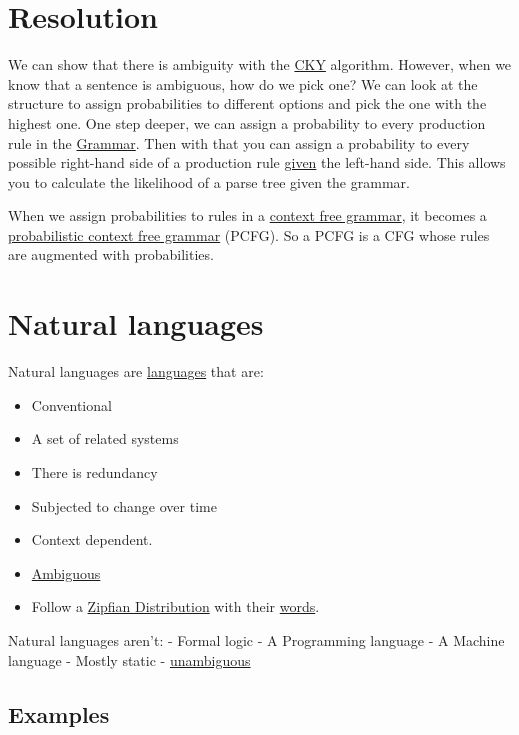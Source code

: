 \documentclass[
  11pt,
  british,
]{article}
\providecommand{\tightlist}{%
  \setlength{\itemsep}{0pt}\setlength{\parskip}{0pt}}
\begin{document}
\hypertarget{resolution}{%
\section{Resolution}\label{resolution}}

We can show that there is ambiguity with the \href{CKY.md}{CKY}
algorithm. However, when we know that a sentence is ambiguous, how do we
pick one? We can look at the structure to assign probabilities to
different options and pick the one with the highest one. One step
deeper, we can assign a probability to every production rule in the
\href{Grammar.md}{Grammar}. Then with that you can assign a probability
to every possible right-hand side of a production rule
\href{../Classification/Native\%20baiyes/Bayes\%20rule.md}{given} the
left-hand side. This allows you to calculate the likelihood of a parse
tree given the grammar.

When we assign probabilities to rules in a
\href{Context\%20free\%20grammars.md}{context free grammar}, it becomes
a \href{Probabilistic\%20Context\%20Free\%20Grammar.md}{probabilistic
context free grammar} (PCFG). So a PCFG is a CFG whose rules are
augmented with probabilities.

\hypertarget{natural-languages}{%
\section{Natural languages}\label{natural-languages}}

Natural languages are \href{Languages.md}{languages} that are:

\begin{itemize}
\tightlist
\item
  Conventional
\item
  A set of related systems
\item
  There is redundancy
\item
  Subjected to change over time
\item
  Context dependent.
\item
  \href{Ambiguity.md}{Ambiguous}
\item
  Follow a \href{Zipfian\%20Distribution.md}{Zipfian Distribution} with
  their \href{../Data/Words.md}{words}.
\end{itemize}

Natural languages aren't: - Formal logic - A Programming language - A
Machine language - Mostly static - \href{Ambiguity.md}{unambiguous}

\hypertarget{examples-3}{%
\subsection{Examples}\label{examples-3}}
\end{document}
